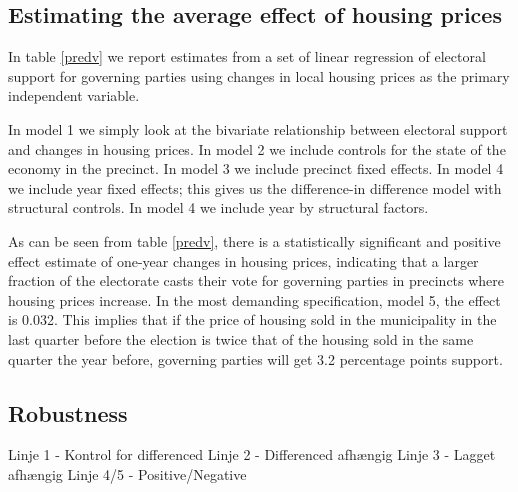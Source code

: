 \documentclass[12pt,a4paper]{article}
\begin{document}
\subsection{Estimating the average effect of housing prices}
In table \ref{predv}  we report estimates from a set of linear regression of electoral support for governing parties using changes in local housing prices as the primary independent variable.

In model 1 we simply look at the bivariate relationship between electoral support and changes in housing prices. In model 2 we include controls for the state of the economy in the precinct. In model 3 we include precinct fixed effects. In model 4 we include year fixed effects; this gives us the difference-in difference model with structural controls. In model 4 we include year by structural factors. 




As can be seen from table \ref{predv}, there is a statistically significant and positive effect estimate of one-year changes in housing prices, indicating that a larger fraction of the electorate casts their vote for governing parties in precincts where housing prices increase. In the most demanding specification, model 5, the effect is 0.032. This implies that if the price of housing sold in the municipality in the last quarter before the election is twice that of the housing sold in the same quarter the year before, governing parties will get 3.2 percentage points support.

\subsection{Robustness}

Linje 1 - Kontrol for differenced
Linje 2 - Differenced afhængig
Linje 3 - Lagget afhængig
Linje 4/5 - Positive/Negative  



%

%




\end{document}
